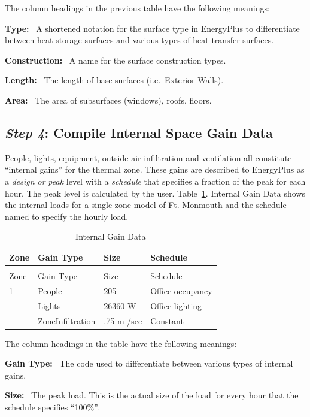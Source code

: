 The column headings in the previous table have the following meanings:

\textbf{Type:}~ A shortened notation for the surface type in EnergyPlus to differentiate between heat storage surfaces and various types of heat transfer surfaces.

\textbf{Construction:}~ A name for the surface construction types.

\textbf{Length:}~ The length of base surfaces (i.e.~Exterior Walls).

\textbf{Area:}~ The area of subsurfaces (windows), roofs, floors.

\subsection{\emph{Step 4}: Compile Internal Space Gain Data}\label{step-4-compile-internal-space-gain-data}

People, lights, equipment, outside air infiltration and ventilation all constitute ``internal gains'' for the thermal zone. These gains are described to EnergyPlus as a \emph{design or} \emph{peak} level with a \emph{schedule} that specifies a fraction of the peak for each hour. The peak level is calculated by the user. Table~\ref{table:internal-gain-data}. Internal Gain Data shows the internal loads for a single zone model of Ft. Monmouth and the schedule named to specify the hourly load.

\begin{longtable}[c]{@{}llll@{}}
\caption{Internal Gain Data \label{table:internal-gain-data}} \tabularnewline
\toprule
Zone & Gain Type & Size & Schedule \tabularnewline
\midrule
\endfirsthead

\caption[]{Internal Gain Data} \tabularnewline
\toprule
Zone & Gain Type & Size & Schedule \tabularnewline
\midrule
\endhead

1 & People & 205 & Office occupancy \tabularnewline
~ & Lights & 26360 W & Office lighting \tabularnewline
~ & ZoneInfiltration & .75 m  /sec & Constant \tabularnewline
\bottomrule
\end{longtable}

The column headings in the table have the following meanings:

\textbf{Gain Type:}~ The code used to differentiate between various types of internal gains.

\textbf{Size:}~ The peak load. This is the actual size of the load for every hour that the schedule specifies ``100\%''.

